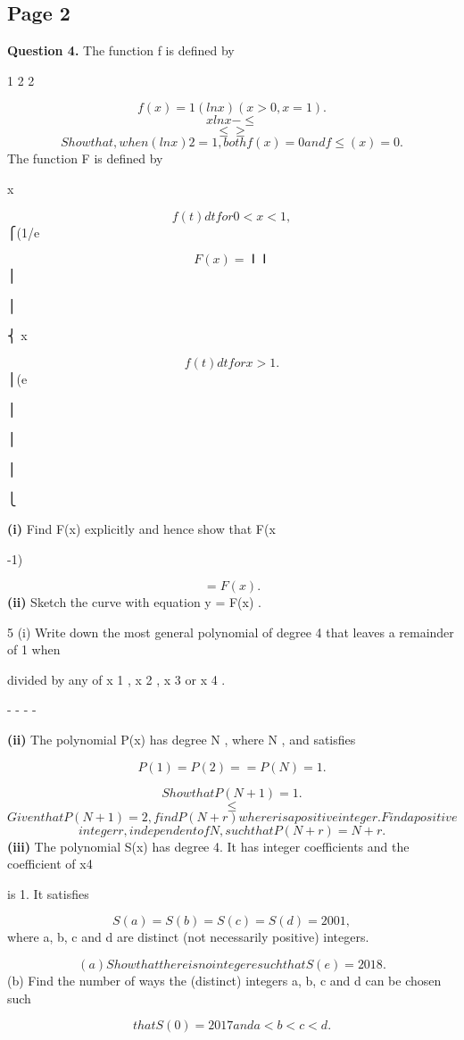 \documentclass[12pt]{article}
\begin{document}
\subsection*{Page 2}
\begin{flushleft}
\bigskip\textbf{Question 4.} The function f is defined by\par
1 2 2\par
\[f(x) = 1 (ln x) (x > 0, x = 1) .\]
\[x ln x - \leq\]
\[\leq \geq\]
\[Show that, when (ln x)2 = 1 , both f(x) = 0 and f \leq (x) = 0 .\]
The function F is defined by\par
x\par
\[f(t) dt for 0 < x < 1 ,\]
⎧(1/e\par
\[F(x) = ⎪ ⎪\]
⎪\par
⎪\par
⎨ x\par
\[f(t) dt for x > 1 .\]
⎪(e\par
⎪\par
⎪\par
⎪\par
⎩\par
\textbf{(i)} Find F(x) explicitly and hence show that F(x\par
-1)\par
\[= F(x) .\]
\textbf{(ii)} Sketch the curve with equation y = F(x) .\par
5 (i) Write down the most general polynomial of degree 4 that leaves a remainder of 1 when\par
divided by any of x 1 , x 2 , x 3 or x 4 .\par
- - - -\par
\textbf{(ii)} The polynomial P(x) has degree N , where N  , and satisfies\par
\[P(1) = P(2) = = P(N ) = 1 .\]
\cdots\par
\[Show that P(N + 1) = 1 .\]
\[\leq\]
\[Given that P(N + 1) = 2 , find P(N + r) where r is a positive integer. Find a positive\]
\[integer r, independent of N , such that P(N + r) = N + r .\]
\textbf{(iii)} The polynomial S(x) has degree 4. It has integer coefficients and the coefficient of x4\par
is 1. It satisfies\par
\[S(a) = S(b) = S(c) = S(d) = 2001 ,\]
where a, b, c and d are distinct (not necessarily positive) integers.\par
\[(a) Show that there is no integer e such that S(e) = 2018 .\]
(b) Find the number of ways the (distinct) integers a, b, c and d can be chosen such\par
\[that S(0) = 2017 and a < b < c < d .\]
\end{flushleft}
\end{document}
